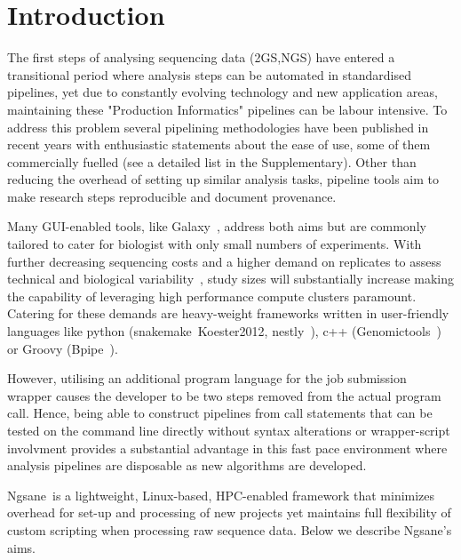\documentclass{bioinfo}
\newcommand{\prog}{{\sc Ngsane}}
\begin{document}
\section{Introduction}

The first steps of analysing sequencing data (2GS,NGS) have entered a transitional period where analysis steps can be automated in standardised pipelines, yet due to constantly evolving technology and new application areas, maintaining these "Production Informatics" pipelines can be labour intensive. 
To address this problem several pipelining methodologies have been published in recent years with enthusiastic statements about the ease of use, some of them commercially fuelled (see a detailed list in the Supplementary). 
Other than reducing the overhead of setting up similar analysis tasks, pipeline tools aim to make research steps reproducible and document provenance. 

Many GUI-enabled tools, like Galaxy~\cite{Goecks2010}, address both aims but are commonly tailored to cater for biologist with only small numbers of experiments. 
With further decreasing sequencing costs and a higher demand on replicates to assess technical and biological variability~\cite{Auer2010}, study sizes will substantially increase making the capability of leveraging high performance compute clusters paramount. 
Catering for these demands are heavy-weight frameworks written in user-friendly languages like python ({\sc snakemake}~Koester2012, {\sc nestly}~\cite{McCoy2013}), c++ ({\sc Genomictools}~\cite{Tsirigos2012}) or Groovy ({\sc Bpipe}~\cite{Sadedin2012}). 

However, utilising an additional program language for the job submission wrapper causes the developer to be two steps removed from the actual program call. 
Hence, being able to construct pipelines from call statements that can be tested on the command line directly without syntax alterations or wrapper-script involvment provides a substantial advantage in this fast pace environment where analysis pipelines are disposable as new algorithms are developed.    
 
\prog\ is a lightweight, Linux-based, HPC-enabled framework that minimizes overhead for set-up and processing of new projects yet maintains full flexibility of custom scripting when processing raw sequence data.
Below we describe \prog's aims.
\end{document}

